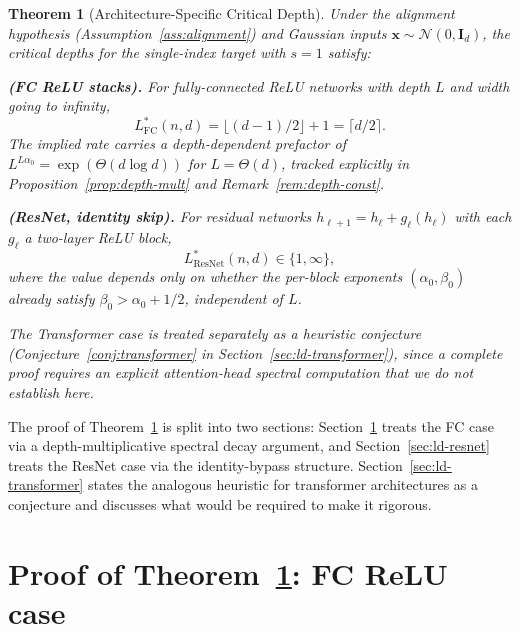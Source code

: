\documentclass[12pt]{amsart}
\newtheorem{theorem}{Theorem}[section]
\theoremstyle{definition}
\theoremstyle{remark}
\newcommand{\bx}{\mathbf{x}}
\newcommand{\bI}{\mathbf{I}}
\begin{document}
\begin{theorem}[Architecture-Specific Critical Depth]\label{thm:critical-depth}
Under the alignment hypothesis (Assumption~\ref{ass:alignment}) and Gaussian
inputs $\bx \sim \mathcal{N}(0,\bI_{d})$, the critical depths for the
single-index target with $s=1$ satisfy:

\textbf{(FC ReLU stacks).} For fully-connected ReLU networks with depth
$L$ and width going to infinity,
\begin{equation}\label{eq:lstar-fc}
  L^{*}_{\mathrm{FC}}(n, d)
  = \lfloor (d-1)/2 \rfloor + 1
  = \lceil d/2 \rceil.
\end{equation}
The implied rate carries a depth-dependent prefactor of
$L^{L\alpha_{0}} = \exp(\Theta(d \log d))$ for $L = \Theta(d)$,
tracked explicitly in Proposition~\ref{prop:depth-mult} and
Remark~\ref{rem:depth-const}.

\textbf{(ResNet, identity skip).} For residual networks
$h_{\ell+1} = h_{\ell} + g_{\ell}(h_{\ell})$ with each $g_{\ell}$ a
two-layer ReLU block,
\begin{equation}\label{eq:lstar-resnet}
  L^{*}_{\mathrm{ResNet}}(n, d) \in \{1, \infty\},
\end{equation}
where the value depends only on whether the per-block exponents
$(\alpha_{0}, \beta_{0})$ already satisfy $\beta_{0} > \alpha_{0}+1/2$,
\emph{independent} of $L$.

The Transformer case is treated separately as a heuristic conjecture
(Conjecture~\ref{conj:transformer} in Section~\ref{sec:ld-transformer}),
since a complete proof requires an explicit attention-head spectral
computation that we do not establish here.
\end{theorem}

The proof of Theorem~\ref{thm:critical-depth} is split into two
sections: Section~\ref{sec:ld-fc} treats the FC case via a
depth-multiplicative spectral decay argument, and
Section~\ref{sec:ld-resnet} treats the ResNet case via the
identity-bypass structure. Section~\ref{sec:ld-transformer} states the
analogous heuristic for transformer architectures as a conjecture and
discusses what would be required to make it rigorous.

\section{Proof of Theorem~\ref{thm:critical-depth}: FC ReLU
  case}\label{sec:ld-fc}
\end{document}
